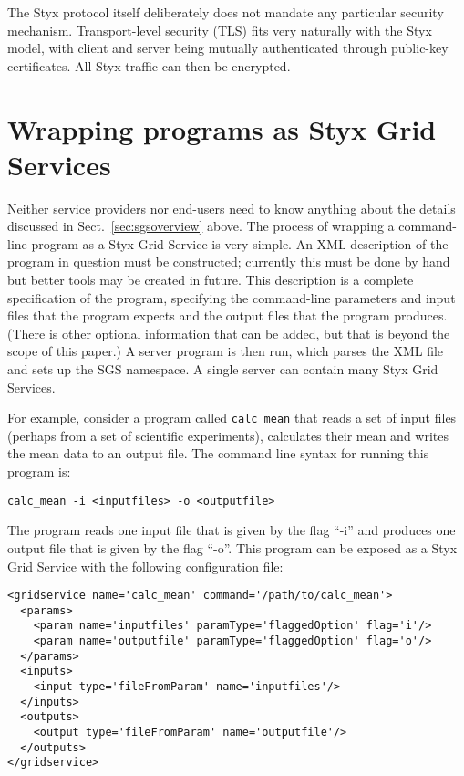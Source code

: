 \documentclass{llncs}
\begin{document}
The Styx protocol itself deliberately does not mandate any particular security mechanism.  Transport-level security (TLS) fits very naturally with the Styx model, with client and server being mutually authenticated through public-key certificates.  All Styx traffic can then be encrypted.


\section{Wrapping programs as Styx Grid Services}
Neither service providers nor end-users need to know anything about the details discussed in Sect.~\ref{sec:sgsoverview} above.  The process of wrapping a command-line program as a Styx Grid Service is very simple.  An XML description of the program in question must be constructed; currently this must be done by hand but better tools may be created in future.  This description is a complete specification of the program, specifying the command-line parameters and input files that the program expects and the output files that the program produces.  (There is other optional information that can be added, but that is beyond the scope of this paper.)  A server program is then run, which parses the XML file and sets up the SGS namespace.  A single server can contain many Styx Grid Services.

For example, consider a program called {\tt calc\_mean} that reads a set of input files (perhaps from a set of scientific experiments), calculates their mean and writes the mean data to an output file.  The command line syntax for running this program is:

\begin{verbatim}
calc_mean -i <inputfiles> -o <outputfile>
\end{verbatim}

The program reads one input file that is given by the flag ``-i'' and produces one output file that is given by the flag ``-o''.  This program can be exposed as a Styx Grid Service with the following configuration file:

\begin{verbatim}
<gridservice name='calc_mean' command='/path/to/calc_mean'>
  <params>
    <param name='inputfiles' paramType='flaggedOption' flag='i'/>
    <param name='outputfile' paramType='flaggedOption' flag='o'/>
  </params>
  <inputs>
    <input type='fileFromParam' name='inputfiles'/>
  </inputs>
  <outputs>
    <output type='fileFromParam' name='outputfile'/>
  </outputs>
</gridservice>
\end{verbatim}
\end{document}
